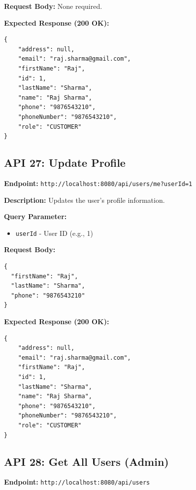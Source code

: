 \documentclass[12pt, a4paper]{article}
\begin{document}
\textbf{Request Body:} None required.

\textbf{Expected Response (200 OK):}
\begin{lstlisting}
{
    "address": null,
    "email": "raj.sharma@gmail.com",
    "firstName": "Raj",
    "id": 1,
    "lastName": "Sharma",
    "name": "Raj Sharma",
    "phone": "9876543210",
    "phoneNumber": "9876543210",
    "role": "CUSTOMER"
}
\end{lstlisting}

\vspace{0.5cm}

\subsection{API 27: Update Profile}

\begin{tcolorbox}[colback=putcolor!10, colframe=putcolor, title=PUT]
\textbf{Endpoint:} \texttt{http://localhost:8080/api/users/me?userId=1}
\end{tcolorbox}

\textbf{Description:} Updates the user's profile information.

\textbf{Query Parameter:}
\begin{itemize}
    \item \texttt{userId} - User ID (e.g., 1)
\end{itemize}

\textbf{Request Body:}
\begin{lstlisting}
{
  "firstName": "Raj",
  "lastName": "Sharma",
  "phone": "9876543210"
}
\end{lstlisting}

\textbf{Expected Response (200 OK):}
\begin{lstlisting}
{
    "address": null,
    "email": "raj.sharma@gmail.com",
    "firstName": "Raj",
    "id": 1,
    "lastName": "Sharma",
    "name": "Raj Sharma",
    "phone": "9876543210",
    "phoneNumber": "9876543210",
    "role": "CUSTOMER"
}
\end{lstlisting}

\vspace{0.5cm}

\subsection{API 28: Get All Users (Admin)}

\begin{tcolorbox}[colback=getcolor!10, colframe=getcolor, title=GET]
\textbf{Endpoint:} \texttt{http://localhost:8080/api/users}
\end{tcolorbox}
\end{document}
